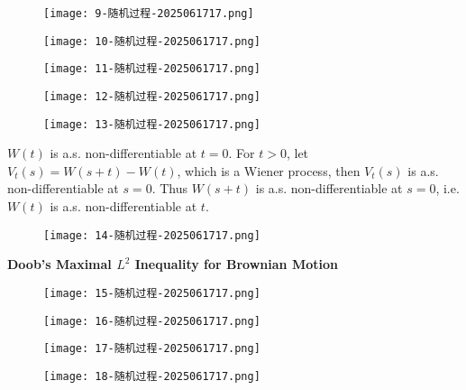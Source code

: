 \begin{figure}[H]
\centering
\texttt{[image: 9-随机过程-2025061717.png]}
\label{}
\end{figure}

\begin{figure}[H]
\centering
\texttt{[image: 10-随机过程-2025061717.png]}
\label{}
\end{figure}
\begin{figure}[H]
\centering
\texttt{[image: 11-随机过程-2025061717.png]}
\label{}
\end{figure}

\begin{figure}[H]
\centering
\texttt{[image: 12-随机过程-2025061717.png]}
\label{}
\end{figure}

\begin{figure}[H]
\centering
\texttt{[image: 13-随机过程-2025061717.png]}
\label{}
\end{figure}

$W(t)$ is a.s. non-differentiable at $t=0$. For $t>0$, let $V_{t}(s)=W(s+t)-W(t)$, which is a Wiener process, then $V_{t}(s)$ is a.s. non-differentiable at $s=0$. Thus $W(s+t)$ is a.s. non-differentiable at $s=0$, i.e. $W(t)$ is a.s. non-differentiable at $t$.

\begin{figure}[H]
\centering
\texttt{[image: 14-随机过程-2025061717.png]}
\label{}
\end{figure}

\textbf{Doob's Maximal $L^2$ Inequality for Brownian Motion}
\begin{figure}[H]
\centering
\texttt{[image: 15-随机过程-2025061717.png]}
\label{}
\end{figure}
\begin{figure}[H]
\centering
\texttt{[image: 16-随机过程-2025061717.png]}
\label{}
\end{figure}

\begin{figure}[H]
\centering
\texttt{[image: 17-随机过程-2025061717.png]}
\label{}
\end{figure}

\begin{figure}[H]
\centering
\texttt{[image: 18-随机过程-2025061717.png]}
\label{}
\end{figure}
